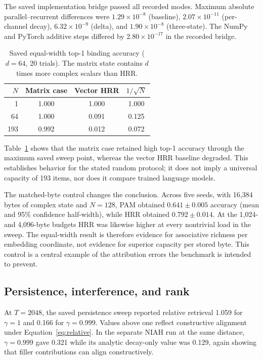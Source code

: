 \documentclass[10pt,twocolumn]{article}
\begin{document}
The saved implementation bridge passed all recorded modes.  Maximum absolute
parallel--recurrent differences were $1.29{\times}10^{-8}$ (baseline),
$2.07{\times}10^{-11}$ (per-channel decay), $6.32{\times}10^{-9}$ (delta), and
$1.90{\times}10^{-8}$ (three-state).  The NumPy and PyTorch additive steps
differed by $2.80{\times}10^{-17}$ in the recorded bridge.

\begin{table}[t]
  \centering
  \caption{Saved equal-width top-1 binding accuracy ($d=64$, 20 trials).
  The matrix state contains $d$ times more complex scalars than HRR.}
  \label{tab:binding}
  \begin{tabular}{rccc}
    \toprule
    $N$ & Matrix case & Vector HRR & $1/\sqrt{N}$\\
    \midrule
    1   & 1.000 & 1.000 & 1.000\\
    64  & 1.000 & 0.091 & 0.125\\
    193 & 0.992 & 0.012 & 0.072\\
    \bottomrule
  \end{tabular}
\end{table}

Table~\ref{tab:binding} shows that the matrix case retained high top-1 accuracy
through the maximum saved sweep point, whereas the vector HRR baseline
degraded.  This establishes behavior for the stated random protocol; it does
not imply a universal capacity of 193 items, nor does it compare trained
language models.

The matched-byte control changes the conclusion.  Across five seeds, with
16,384 bytes of complex state and $N=128$, PAM obtained
$0.641\pm0.005$ accuracy (mean and 95\% confidence half-width), while HRR
obtained $0.792\pm0.014$.  At the 1,024- and 4,096-byte budgets HRR was likewise
higher at every nontrivial load in the sweep.  The equal-width result is
therefore evidence for associative richness per embedding coordinate, not
evidence for superior capacity per stored byte.  This control is a central
example of the attribution errors the benchmark is intended to prevent.

\subsection{Persistence, interference, and rank}

At $T=2048$, the saved persistence sweep reported relative retrieval 1.059 for
$\gamma=1$ and 0.166 for $\gamma=0.999$.  Values above one reflect constructive
alignment under Equation~\ref{eq:relative}.  In the separate NIAH run at the
same distance, $\gamma=0.999$ gave 0.321 while its analytic decay-only value
was 0.129, again showing that filler contributions can align constructively.
\end{document}
